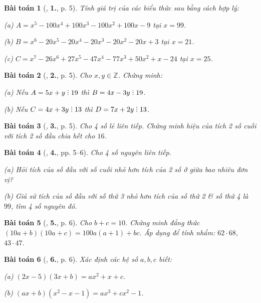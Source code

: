 \documentclass{article}
\numberwithin{equation}{section}
\newtheorem{baitoan}{Bài toán}[section]
\DeclareRobustCommand{\divby}{%
	\mathrel{\vbox{\baselineskip.65ex\lineskiplimit0pt\hbox{.}\hbox{.}\hbox{.}}}%
}
\begin{document}
\begin{baitoan}[\cite{Tuyen_Toan_8}, \textbf{1.}, p. 5]
	Tính giá trị của các biểu thức sau bằng cách hợp lý:\\
	\begin{enumerate*}
		\item[(a)] $A = x^5 - 100x^4 + 100x^3 - 100x^2 + 100x - 9$ tại $x = 99$.
		\item[(b)] $B = x^6 - 20x^5 - 20x^4 - 20x^3 - 20x^2 - 20x + 3$ tại $x  = 21$.
		\item[(c)] $C = x^7 - 26x^6 + 27x^5 - 47x^4 - 77x^3 + 50x^2 + x - 24$ tại $x = 25$.
	\end{enumerate*}
\end{baitoan}

\begin{baitoan}[\cite{Tuyen_Toan_8}, \textbf{2.}, p. 5]
	Cho $x,y\in\mathbb{Z}$. Chứng minh:
	\begin{enumerate*}
		\item[(a)] Nếu $A = 5x + y\divby19$ thì $B = 4x - 3y\divby19$.
		\item[(b)] Nếu $C = 4x + 3y\divby13$ thì $D = 7x + 2y\divby13$.
	\end{enumerate*}
\end{baitoan}

\begin{baitoan}[\cite{Tuyen_Toan_8}, \textbf{3.}, p. 5]
	Cho 4 số lẻ liên tiếp. Chứng minh hiệu của tích 2 số cuối với tích 2 số đầu chia hết cho $16$.
\end{baitoan}

\begin{baitoan}[\cite{Tuyen_Toan_8}, \textbf{4.}, pp. 5--6]
	Cho 4 số nguyên liên tiếp.
	\begin{enumerate*}
		\item[(a)] Hỏi tích của số đầu với số cuối nhỏ hơn tích của 2 số ở giữa bao nhiêu đơn vị?
		\item[(b)] Giả sử tích của số đầu với số thứ 3 nhỏ hơn tích của số thứ 2 \& số thứ 4 là $99$, tìm 4 số nguyên đó.
	\end{enumerate*}
\end{baitoan}

\begin{baitoan}[\cite{Tuyen_Toan_8}, \textbf{5.}, p. 6]
	Cho $b + c = 10$. Chứng minh đẳng thức $(10a + b)(10a + c) = 100a(a + 1) + bc$. Áp dụng để tính nhẩm: $62\cdot68$, $43\cdot47$.
\end{baitoan}

\begin{baitoan}[\cite{Tuyen_Toan_8}, \textbf{6.}, p. 6]
	Xác định các hệ số $a,b,c$ biết:
	\begin{enumerate*}
		\item[(a)] $(2x - 5)(3x + b) = ax^2 + x + c$.\\
		\item[(b)] $(ax + b)(x^2 - x - 1) = ax^3 + cx^2 - 1$.
	\end{enumerate*}
\end{baitoan}
\end{document}
